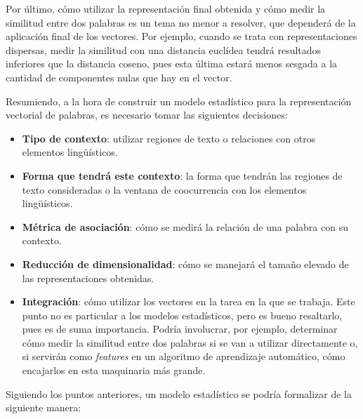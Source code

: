 Por último, cómo utilizar la representación final obtenida y cómo medir la similitud entre dos
palabras es un tema no menor a resolver, que dependerá de la aplicación final de los vectores. Por
ejemplo, cuando se trata con representaciones dispersas, medir la similitud con una distancia
euclídea tendrá resultados inferiores que la distancia coseno, pues esta última estará menos sesgada
a la cantidad de componentes nulas que hay en el vector.

Resumiendo, a la hora de construir un modelo estadístico para la representación vectorial de
palabras, es necesario tomar las siguientes decisiones:

\begin{itemize}

\item \textbf{Tipo de contexto}: utilizar regiones de texto o relaciones con otros elementos
lingüísticos.

\item \textbf{Forma que tendrá este contexto}: la forma que tendrán las regiones de texto
consideradas o la ventana de coocurrencia con los elementos lingüísticos.

\item \textbf{Métrica de asociación}: cómo se medirá la relación de una palabra con su contexto.

\item \textbf{Reducción de dimensionalidad}: cómo se manejará el tamaño elevado de las
representaciones obtenidas.

\item \textbf{Integración}: cómo utilizar los vectores en la tarea en la que se trabaja. Este punto
no es particular a los modelos estadísticos, pero es bueno resaltarlo, pues es de suma
importancia. Podría involucrar, por ejemplo, determinar cómo medir la similitud entre dos palabras
si se van a utilizar directamente o, si servirán como \textit{features} en un algoritmo de
aprendizaje automático, cómo encajarlos en esta maquinaria más grande.

\end{itemize}

Siguiendo los puntos anteriores, un modelo estadístico se podría formalizar de la siguiente manera:

